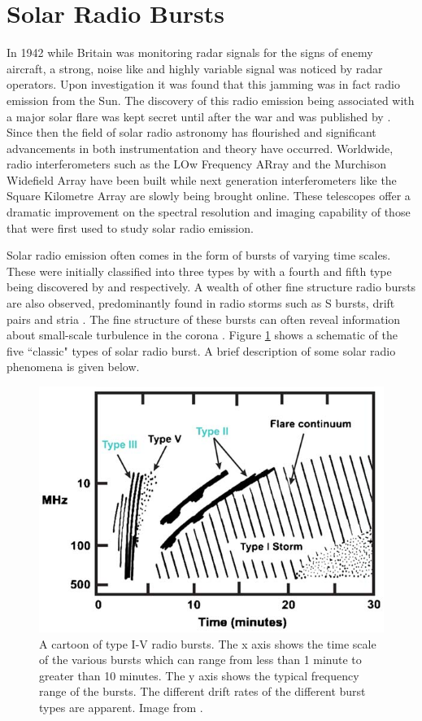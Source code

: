 \section{Solar Radio Bursts}
\label{sec:solar_radio_bursts}
In 1942 while Britain was monitoring radar signals for the signs of enemy aircraft, a strong, noise like and highly variable signal was noticed by radar operators. Upon investigation it was found that this jamming was in fact radio emission from the Sun. The discovery of this radio emission being associated with a major solar flare was kept secret until after the war and was published by \cite{Appleton1946}.
Since then the field of solar radio astronomy has flourished and significant advancements in both instrumentation and theory have occurred. Worldwide, radio interferometers such as the LOw Frequency ARray \cite[LOFAR;][]{VanHaarlem2013} and the Murchison Widefield Array \citep[MWA;][]{Lonsdale2009} have been built while next generation interferometers like the Square Kilometre Array \citep[SKA;][]{McMullin2020} are slowly being brought online. These telescopes offer a dramatic improvement on the spectral resolution and imaging capability of those that were first used to study solar radio emission.

Solar radio emission often comes in the form of bursts of varying time scales. These were initially classified into three types by \cite{Wild1950b} with a fourth and fifth type being discovered by \cite{Boischot1957} and \cite{Wild1959} respectively. A wealth of other fine structure radio bursts are also observed, predominantly found in radio storms such as S bursts, drift pairs and stria \citep{McConnell1980,Melrose1982,NelsonandMelrose1985}. 
The fine structure of these bursts can often reveal information about small-scale turbulence in the corona \citep{Reid2021}.
Figure \ref{fig:burst_cartoon} shows a schematic of the five ``classic" types of solar radio burst. A brief description of some solar radio phenomena is given below.
\begin{figure}[ht]
    \centering
    \includegraphics[width=0.75\columnwidth]{Images/Burst_cartoon.jpg}
    \caption[Cartoon of type I-V radio bursts.]{A cartoon of type I-V radio bursts. The x axis shows the time scale of the various bursts which can range from less than 1 minute to greater than 10 minutes. The y axis shows the typical frequency range of the bursts. The different drift rates of the different burst types are apparent. Image from \cite{Cliver2009}.}
    \label{fig:burst_cartoon}
\end{figure}

